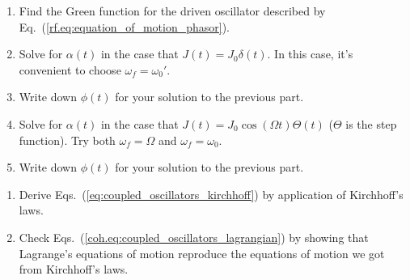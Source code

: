 \begin{enumerate}[label=\alph*.]
  \item Find the Green function for the driven oscillator described by Eq.~(\ref{rf.eq:equation_of_motion_phasor}).
  \item Solve for $\alpha(t)$ in the case that $J(t) = J_0 \delta(t)$. In this case, it's convenient to choose $\omega_f = \omega_0'$.
  \item Write down $\phi(t)$ for your solution to the previous part.
  \item Solve for $\alpha(t)$ in the case that $J(t) = J_0 \cos(\Omega t)\Theta(t)$ ($\Theta$ is the step function). Try both $\omega_f = \Omega$ and $\omega_f = \omega_0$.
  \item Write down $\phi(t)$ for your solution to the previous part.
\end{enumerate}


\begin{enumerate}[label=\alph*.]
  \item Derive Eqs.~(\ref{eq:coupled_oscillators_kirchhoff}) by application of Kirchhoff's laws.
  \item Check Eqs.~(\ref{coh.eq:coupled_oscillators_lagrangian}) by showing that Lagrange's equations of motion reproduce the equations of motion we got from Kirchhoff's laws.
\end{enumerate}
